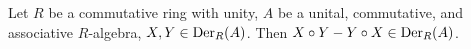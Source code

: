 \begin{proposition}
  Let $R$ be a commutative ring with unity,
  $A$ be a unital, commutative, and associative $R$-algebra,
  $X, Y \in {\rm Der}_R(A)$.
  Then $X \circ Y - Y \circ X \in {\rm Der}_R(A)$.
\end{proposition}
